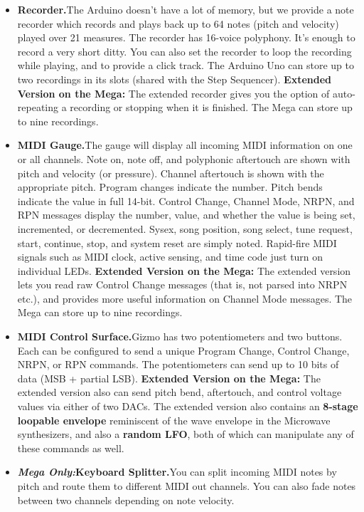 \documentclass{article}
\begin{document}
\begin{itemize}
\item {\bf Recorder.}\quad The Arduino doesn't have a lot of memory, but we provide a note recorder which records and plays back up to 64 notes (pitch and velocity) played over 21 measures. The recorder has 16-voice polyphony.   It's enough to record a very short ditty.  You can also set the recorder to loop the recording while playing, and to provide a click track.  The Arduino Uno can store up to two recordings in its slots (shared with the Step Sequencer).   {\bf Extended Version on the Mega:}  The extended recorder gives you the option of auto-repeating a recording or stopping when it is finished.  The Mega can store up to nine recordings.

\item {\bf MIDI Gauge.}\quad The gauge will display all incoming MIDI information on one or all channels.  Note on, note off, and polyphonic aftertouch are shown with pitch and velocity (or pressure).  Channel aftertouch is shown with the appropriate pitch.  Program changes indicate the number.  Pitch bends indicate the value in full 14-bit.  Control Change, Channel Mode, NRPN, and RPN messages display the number, value, and whether the value is being set, incremented, or decremented.  Sysex, song position, song select, tune request, start, continue, stop, and system reset are simply noted.  Rapid-fire MIDI signals such as MIDI clock, active sensing, and time code just turn on individual LEDs. {\bf Extended Version on the Mega:}  The extended version lets you read raw Control Change messages (that is, not parsed into NRPN etc.), and provides more useful information on Channel Mode messages.  The Mega can store up to nine recordings.

\item {\bf MIDI Control Surface.}\quad Gizmo has two potentiometers and two buttons.  Each can be configured to send a unique Program Change, Control Change, NRPN, or RPN commands.  The potentiometers can send up to 10 bits of data (MSB + partial LSB).   {\bf Extended Version on the Mega:}  The extended version also can send pitch bend, aftertouch, and control voltage values via either of two DACs.   The extended version also contains an {\bf 8-stage loopable envelope} reminiscent of the wave envelope in the Microwave synthesizers, and also a {\bf random LFO}, both of which can manipulate any of these commands as well.

\item {\bf \textit{Mega Only:}\quad Keyboard Splitter.}\quad You can split incoming MIDI notes by pitch and route them to different MIDI out channels.  You can also fade notes between two channels depending on note velocity.


\end{itemize}
\end{document}
